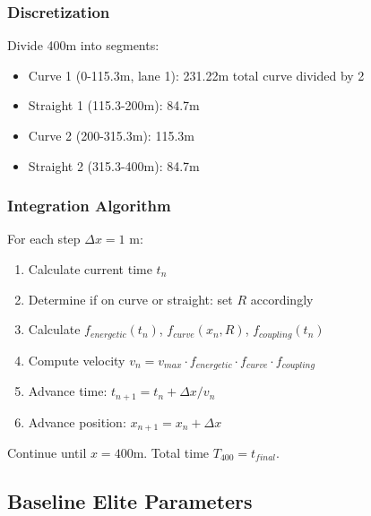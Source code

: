 \subsubsection{Discretization}

Divide 400m into segments:
\begin{itemize}
    \item Curve 1 (0-115.3m, lane 1): 231.22m total curve divided by 2
    \item Straight 1 (115.3-200m): 84.7m
    \item Curve 2 (200-315.3m): 115.3m
    \item Straight 2 (315.3-400m): 84.7m
\end{itemize}

\subsubsection{Integration Algorithm}

For each step $\Delta x = 1$ m:
\begin{enumerate}
    \item Calculate current time $t_n$
    \item Determine if on curve or straight: set $R$ accordingly
    \item Calculate $f_{energetic}(t_n)$, $f_{curve}(x_n,R)$, $f_{coupling}(t_n)$
    \item Compute velocity $v_n = v_{max} \cdot f_{energetic} \cdot f_{curve} \cdot f_{coupling}$
    \item Advance time: $t_{n+1} = t_n + \Delta x/v_n$
    \item Advance position: $x_{n+1} = x_n + \Delta x$
\end{enumerate}

Continue until $x = 400$m. Total time $T_{400} = t_{final}$.

\subsection{Baseline Elite Parameters}

